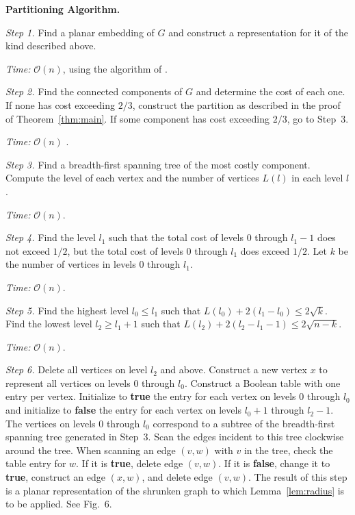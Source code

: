 \documentclass[12pt]{article}
\theoremstyle{remark}
\newcommand{\bigO}{\mathcal{O}}
\begin{document}
\bigskip
\noindent\textbf{Partitioning Algorithm.}

\medskip
\noindent\textit{Step 1.} Find a planar embedding of $G$ and construct a
representation for it of the kind described above.

\begin{center}
\textit{Time:} $\bigO(n)$, using the algorithm of \cite{hopcroft74}.
\end{center}

\noindent\textit{Step 2.} Find the connected components of $G$ and determine the cost
of each one. If none has cost exceeding $2/3$, construct the partition as described
in the proof of Theorem~\ref{thm:main}. If some component has cost exceeding $2/3$,
go to Step~3.

\begin{center}
\textit{Time:} $\bigO(n)$ \cite{hopcroft73}.
\end{center}

\noindent\textit{Step 3.} Find a breadth-first spanning tree of the most costly
component. Compute the level of each vertex and the number of vertices $L(l)$ in
each level $l$.

\begin{center}
\textit{Time:} $\bigO(n)$.
\end{center}

\noindent\textit{Step 4.} Find the level $l_1$ such that the total cost of levels $0$
through $l_1 - 1$ does not exceed $1/2$, but the total cost of levels $0$ through
$l_1$ does exceed $1/2$. Let $k$ be the number of vertices in levels $0$ through
$l_1$.

\begin{center}
\textit{Time:} $\bigO(n)$.
\end{center}

\noindent\textit{Step 5.} Find the highest level $l_0 \leq l_1$ such that
$L(l_0) + 2(l_1 - l_0) \leq 2\sqrt{k}$. Find the lowest level $l_2 \geq l_1 + 1$
such that $L(l_2) + 2(l_2 - l_1 - 1) \leq 2\sqrt{n-k}$.

\begin{center}
\textit{Time:} $\bigO(n)$.
\end{center}

\noindent\textit{Step 6.} Delete all vertices on level $l_2$ and above. Construct a
new vertex $x$ to represent all vertices on levels $0$ through $l_0$. Construct a
Boolean table with one entry per vertex. Initialize to \textbf{true} the entry for
each vertex on levels $0$ through $l_0$ and initialize to \textbf{false} the entry
for each vertex on levels $l_0 + 1$ through $l_2 - 1$. The vertices on levels $0$
through $l_0$ correspond to a subtree of the breadth-first spanning tree generated in
Step~3. Scan the edges incident to this tree clockwise around the tree. When scanning
an edge $(v, w)$ with $v$ in the tree, check the table entry for $w$. If it is
\textbf{true}, delete edge $(v, w)$. If it is \textbf{false}, change it to
\textbf{true}, construct an edge $(x, w)$, and delete edge $(v, w)$. The result of
this step is a planar representation of the shrunken graph to which
Lemma~\ref{lem:radius} is to be applied. See Fig.~6.
\end{document}
